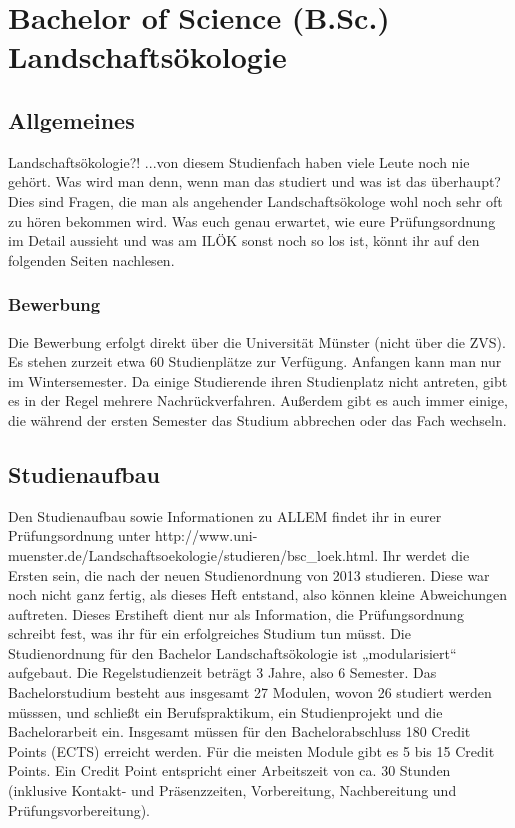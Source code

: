 \chapter{Bachelor of Science (B.Sc.) Landschaftsökologie}

\section{Allgemeines}
Landschaftsökologie?! ...von diesem Studienfach haben viele Leute noch nie gehört. Was wird man denn, wenn man das studiert und was ist das überhaupt? Dies sind Fragen, die man als angehender Landschaftsökologe wohl noch sehr oft zu hören bekommen wird. Was euch genau erwartet, wie eure Prüfungsordnung im Detail aussieht und was am ILÖK sonst noch so los ist, könnt ihr auf den folgenden Seiten nachlesen.

\subsection*{Bewerbung}
Die Bewerbung erfolgt direkt über die Universität Münster (nicht über die ZVS). Es stehen zurzeit etwa 60 Studienplätze zur Verfügung. Anfangen kann man nur im Wintersemester. Da einige Studierende ihren Studienplatz nicht antreten, gibt es in der Regel mehrere Nachrückverfahren. Außerdem gibt es auch immer einige, die während der ersten Semester das Studium abbrechen oder das Fach wechseln.

\section{Studienaufbau}
Den Studienaufbau sowie Informationen zu ALLEM findet ihr in eurer Prüfungsordnung unter http://www.uni-muenster.de/Landschaftsoekologie/studieren/bsc_loek.html. Ihr werdet die Ersten sein, die nach der neuen Studienordnung von 2013 studieren. Diese war noch nicht ganz fertig, als dieses Heft entstand, also können kleine Abweichungen auftreten. Dieses Erstiheft dient nur als Information, die Prüfungsordnung schreibt fest, was ihr für ein erfolgreiches Studium tun müsst. 
Die Studienordnung für den Bachelor Landschaftsökologie ist „modularisiert“ aufgebaut. Die Regelstudienzeit beträgt 3 Jahre, also 6 Semester. Das Bachelorstudium besteht aus insgesamt 27 Modulen, wovon 26 studiert werden müsssen, und schließt ein Berufspraktikum, ein Studienprojekt und die Bachelorarbeit ein. Insgesamt müssen für den Bachelorabschluss 180 Credit Points (ECTS) erreicht werden. Für die meisten Module gibt es 5 bis 15 Credit Points. Ein Credit Point entspricht einer Arbeitszeit von ca. 30 Stunden (inklusive Kontakt- und Präsenzzeiten, Vorbereitung, Nachbereitung und Prüfungsvorbereitung). 

